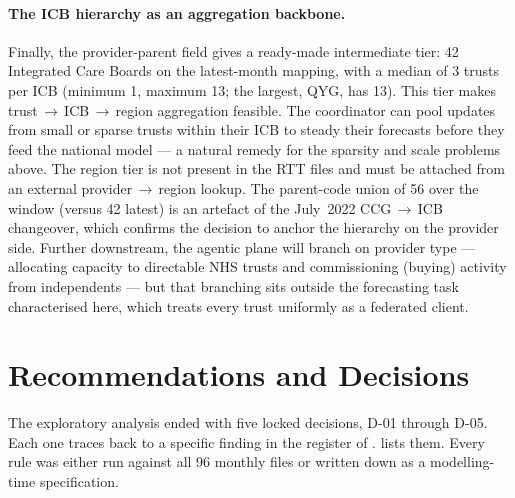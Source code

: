 \documentclass[11pt,a4paper]{article}
\begin{document}
\paragraph{The ICB hierarchy as an aggregation backbone.} Finally, the provider-parent field gives a ready-made intermediate tier: 42 Integrated Care Boards on the latest-month mapping, with a median of 3 trusts per ICB (minimum 1, maximum 13; the largest, QYG, has 13). This tier makes trust\,$\rightarrow$\,ICB\,$\rightarrow$\,region aggregation feasible. The coordinator can pool updates from small or sparse trusts within their ICB to steady their forecasts before they feed the national model --- a natural remedy for the sparsity and scale problems above. The region tier is not present in the RTT files and must be attached from an external provider\,$\rightarrow$\,region lookup. The parent-code union of 56 over the window (versus 42 latest) is an artefact of the July~2022 CCG\,$\rightarrow$\,ICB changeover, which confirms the decision to anchor the hierarchy on the provider side. Further downstream, the agentic plane will branch on provider type --- allocating capacity to directable NHS trusts and commissioning (buying) activity from independents --- but that branching sits outside the forecasting task characterised here, which treats every trust uniformly as a federated client.

\section{Recommendations and Decisions}\label{sec:reco}

The exploratory analysis ended with five locked decisions, D-01 through D-05. Each one traces back to a specific finding in the register of .  lists them. Every rule was either run against all 96 monthly files or written down as a modelling-time specification.
\end{document}
